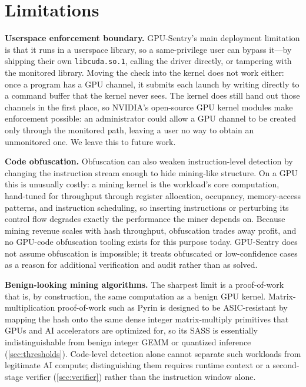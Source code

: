 \section{Limitations}
\label{sec:limitations}

\textbf{Userspace enforcement boundary.} GPU-Sentry's main deployment limitation is that it runs in a userspace library, so a same-privilege user can bypass it---by shipping their own \texttt{libcuda.so.1}, calling the driver directly, or tampering with the monitored library. Moving the check into the kernel does not work either: once a program has a GPU channel, it submits each launch by writing directly to a command buffer that the kernel never sees. The kernel does still hand out those channels in the first place, so NVIDIA's open-source GPU kernel modules make enforcement possible: an administrator could allow a GPU channel to be created only through the monitored path, leaving a user no way to obtain an unmonitored one. We leave this to future work.

\textbf{Code obfuscation.} Obfuscation can also weaken instruction-level detection by changing the instruction stream enough to hide mining-like structure. On a GPU this is unusually costly: a mining kernel is the workload's core computation, hand-tuned for throughput through register allocation, occupancy, memory-access patterns, and instruction scheduling, so inserting instructions or perturbing its control flow degrades exactly the performance the miner depends on. Because mining revenue scales with hash throughput, obfuscation trades away profit, and no GPU-code obfuscation tooling exists for this purpose today. GPU-Sentry does not assume obfuscation is impossible; it treats obfuscated or low-confidence cases as a reason for additional verification and audit rather than as solved.

\textbf{Benign-looking mining algorithms.} The sharpest limit is a proof-of-work that is, by construction, the same computation as a benign GPU kernel. Matrix-multiplication proof-of-work such as Pyrin is designed to be ASIC-resistant by mapping the hash onto the same dense integer matrix-multiply primitives that GPUs and AI accelerators are optimized for, so its SASS is essentially indistinguishable from benign integer GEMM or quantized inference (\cref{sec:thresholds}). Code-level detection alone cannot separate such workloads from legitimate AI compute; distinguishing them requires runtime context or a second-stage verifier (\cref{sec:verifier}) rather than the instruction window alone.

